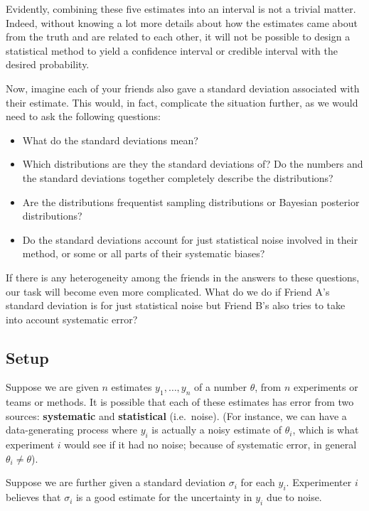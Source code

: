 \documentclass[letterpaper,12pt]{article}
\begin{document}
Evidently, combining these five estimates into an interval is not a trivial matter. Indeed, without knowing a lot more details about how the estimates came about from the truth and are related to each other, it will not be possible to design a statistical method to yield a confidence interval or credible interval with the desired probability.

Now, imagine each of your friends also gave a standard deviation associated with their estimate. This would, in fact, complicate the situation further, as we would need to ask the following questions:

\begin{itemize}

\item
  What do the standard deviations mean?
\item
  Which distributions are they the standard deviations of? Do the numbers and the standard deviations together completely describe the distributions?
\item
  Are the distributions frequentist sampling distributions or Bayesian posterior distributions?
\item
  Do the standard deviations account for just statistical noise involved in their method, or some or all parts of their systematic biases?
\end{itemize}

If there is any heterogeneity among the friends in the answers to these questions, our task will become even more complicated. What do we do if Friend A's standard deviation is for just statistical noise but Friend B's also tries to take into account systematic error?

\subsection{Setup}\label{setup}

Suppose we are given $n$ estimates $y_1,\ldots,y_n$ of a number $\theta$, from $n$ experiments or teams or methods. It is possible that each of these estimates has error from two sources: \textbf{systematic} and \textbf{statistical} (i.e.~noise). (For instance, we can have a data-generating process where $y_i$ is actually a noisy estimate of $\theta_i$, which is what experiment $i$ would see if it had no noise; because of systematic error, in general $\theta_i\neq \theta$).

Suppose we are further given a standard deviation $\sigma_i$ for each $y_i$. Experimenter $i$ believes that $\sigma_i$ is a good estimate for the uncertainty in $y_i$ due to noise.
\end{document}
